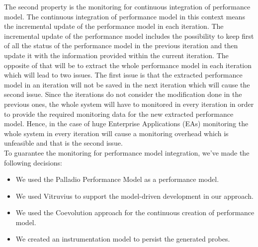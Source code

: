 The second property is the monitoring for continuous integration of performance model. The continuous integration of performance model in this context means the incremental update of the performance model in each iteration. The incremental update of the performance model includes the possibility to keep first of all the status of the performance model in the previous iteration and then update it with the information provided within the current iteration. The opposite of that will be to extract the whole performance model in each iteration which will lead to two issues. The first issue is that the extracted performance model in an iteration will not be saved in the next iteration which will cause the second issue. Since the iterations do not consider the modification done in the previous ones, the whole system will have to monitored in every iteration in order to provide the required monitoring data for the new extracted performance model. Hence, in the case of huge Enterprise Applications (EAs) monitoring the whole system in every iteration will cause a monitoring overhead which is unfeasible and that is the second issue. \\

To guarantee the monitoring for performance model integration, we’ve made the following decisions: 
\begin{itemize}
\item We used the Palladio Performance Model as a performance model.  
\item We used Vitruvius to support the model-driven development in our approach.
\item We used the Coevolution approach for the continuous creation of performance model. 
\item We created an instrumentation model to persist the generated probes.
\end{itemize}

